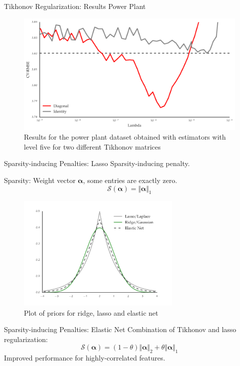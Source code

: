 \documentclass{beamer}
\begin{document}
\begin{frame}{Tikhonov Regularization: Results Power Plant}
\begin{figure}[H]
\centering
\includegraphics[width=\textwidth]{tikhonov_power_plant_l5}
\caption{Results for the power plant dataset obtained with estimators with level
five for two different Tikhonov matrices}
\end{figure}
   
  \end{frame}
  \begin{frame}{Sparsity-inducing Penalties: Lasso}
Sparsity-inducing penalty.

Sparsity: Weight vector \(\bm{\alpha}\), some entries are exactly zero.
 \begin{equation}
\mathcal{S}(\bm{\alpha}) = \Vert \bm{\alpha} \Vert_1
\end{equation}   
 \begin{figure}[tb]
    \centering
    \includegraphics[width=0.7\textwidth]{pdfs}
    \caption{Plot of priors for ridge, lasso and elastic net}\label{fig:reg-pdfs}
\end{figure}  
  \end{frame}
  \begin{frame}{Sparsity-inducing Penalties: Elastic Net}
Combination of Tikhonov and lasso regularization:
\begin{equation}
  \mathcal{S}(\bm{\alpha}) = \left(1 - \theta \right) \Vert \bm{\alpha} \Vert_2  + \theta \Vert \bm{\alpha} \Vert _1
\end{equation}
Improved performance for highly-correlated features. 
  \end{frame}
\end{document}
